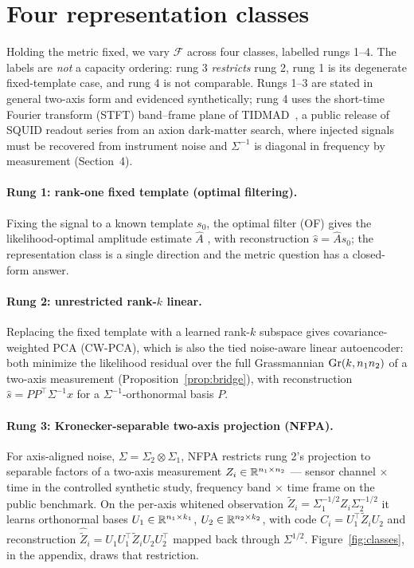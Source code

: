 \section{Four representation classes}

Holding the metric fixed, we vary $\mathcal{F}$ across four classes, labelled rungs 1--4. The labels are \emph{not} a capacity ordering: rung 3 \emph{restricts} rung 2, rung 1 is its degenerate fixed-template case, and rung 4 is not comparable. Rungs 1--3 are stated in general two-axis form and evidenced synthetically; rung 4 uses the short-time Fourier transform (STFT) band--frame plane of TIDMAD~\mbox{\citep{fry2024tidmad}}, a public release of SQUID readout series from an axion dark-matter search, where injected signals must be recovered from instrument noise and $\Sigma^{-1}$ is diagonal in frequency by measurement (Section~4).

\paragraph{Rung 1: rank-one fixed template (optimal filtering).}
Fixing the signal to a known template $s_0$, the optimal filter (OF) gives the likelihood-optimal amplitude estimate $\hat A$ \citep{gatti1986processing,turin1960introduction}, with reconstruction $\hat s=\hat As_0$; the representation class is a single direction and the metric question has a closed-form answer.

\paragraph{Rung 2: unrestricted rank-$k$ linear.}
Replacing the fixed template with a learned rank-$k$ subspace gives covariance-weighted PCA (CW-PCA), which is also the tied noise-aware linear autoencoder: both minimize the likelihood residual over the full Grassmannian $\mathrm{Gr}(k,n_1n_2)$ of a two-axis measurement (Proposition~\ref{prop:bridge}), with reconstruction $\hat s=PP^\top\Sigma^{-1}x$ for a $\Sigma^{-1}$-orthonormal basis $P$.

\paragraph{Rung 3: Kronecker-separable two-axis projection (NFPA).}
For axis-aligned noise, $\Sigma=\Sigma_2\otimes\Sigma_1$, NFPA restricts rung 2's projection to separable factors of a two-axis measurement $Z_i\in\mathbb{R}^{n_1\times n_2}$ --- sensor channel $\times$ time in the controlled synthetic study, frequency band $\times$ time frame on the public benchmark. On the per-axis whitened observation $\tilde Z_i=\Sigma_1^{-1/2}Z_i\Sigma_2^{-1/2}$ it learns orthonormal bases $U_1\in\mathbb{R}^{n_1\times k_1}$, $U_2\in\mathbb{R}^{n_2\times k_2}$, with code $C_i=U_1^\top\tilde Z_iU_2$ and reconstruction $\hat{\tilde Z}_i=U_1U_1^\top\tilde Z_iU_2U_2^\top$ mapped back through $\Sigma^{1/2}$. Figure~\ref{fig:classes}, in the appendix, draws that restriction.


